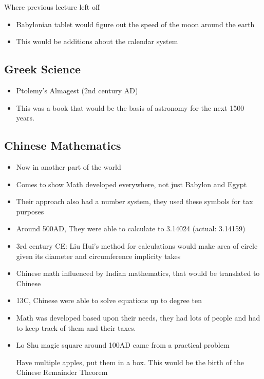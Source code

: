 \documentclass{article}
\begin{document}
Where previous lecture left off
\begin{itemize}
  \item Babylonian tablet would figure out the speed of the moon around the earth
  \item This would be additions about the calendar system
\end{itemize}

\subsection{Greek Science}
\begin{itemize}
  \item Ptolemy's Almagest (2nd century AD)
  \item This was a book that would be the basis of
    astronomy for the next 1500 years.
\end{itemize}

\subsection{Chinese Mathematics}
\begin{itemize}
  \item Now in another part of the world
  \item Comes to show Math developed everywhere,
    not just Babylon and Egypt
  \item Their approach also had a number system, they
    used these symbols for tax purposes
  \item Around 500AD, They were able to calculate \pi{} to 3.14024 (actual: 3.14159)
  \item 3rd century CE: Liu Hui's method for calculations
    would make area of circle given its diameter and circumference implicity takes \pi{}
  \item Chinese math influenced by Indian mathematics,
    that would be translated to Chinese
  \item 13C, Chinese were able to solve equations up to degree ten
  \item Math was developed based upon their needs, they
    had lots of people and had to keep track of them and their taxes.
  \item Lo Shu magic square around 100AD
    came from a practical problem

    Have multiple apples, put them in a box.
    This would be the birth of the Chinese
    Remainder Theorem
\end{itemize}
\end{document}
